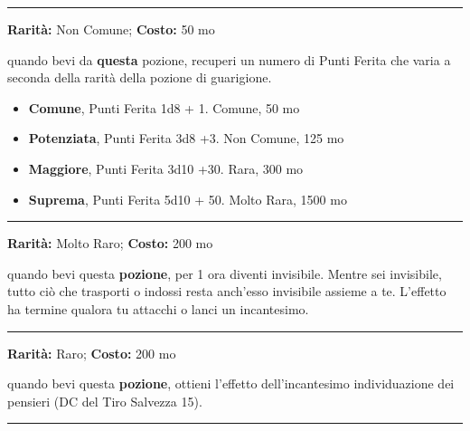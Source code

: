 \begin{multicols}{2}
\smallskip\noindent\rule{\linewidth}{2pt}  \hypertarget{PozionediGuarigione}{}\medskip{}\noindent\label{PozionediGuarigione}

\textbf{Rarità:} Non Comune; \textbf{Costo:} 50 mo

quando bevi da \textbf{questa} pozione, recuperi un numero di Punti Ferita che varia a seconda della rarità della pozione di guarigione.

\begin{itemize} \setlength\itemsep{0em}
\item \textbf{Comune}, Punti Ferita 1d8 + 1. Comune, 50 mo
\item \textbf{Potenziata}, Punti Ferita 3d8 +3. Non Comune, 125 mo
\item \textbf{Maggiore}, Punti Ferita 3d10 +30. Rara, 300 mo
\item \textbf{Suprema}, Punti Ferita 5d10 + 50. Molto Rara, 1500 mo
\end{itemize}

\smallskip\noindent\rule{\linewidth}{2pt}  \hypertarget{PozionediInvisibilità}{}\medskip{}\noindent\label{PozionediInvisibilità}

\textbf{Rarità:} Molto Raro; \textbf{Costo:} 200 mo

quando bevi questa \textbf{pozione}, per 1 ora diventi invisibile. Mentre sei invisibile, tutto ciò che trasporti o indossi resta anch'esso invisibile assieme a te. L'effetto ha termine qualora tu attacchi o lanci un incantesimo.

\smallskip\noindent\rule{\linewidth}{2pt}  \hypertarget{PozionediLetturadelPensiero}{}\medskip{}\noindent\label{PozionediLetturadelPensiero}

\textbf{Rarità:} Raro; \textbf{Costo:} 200 mo

quando bevi questa \textbf{pozione}, ottieni l'effetto dell'incantesimo individuazione dei pensieri (DC del Tiro Salvezza 15).

\smallskip\noindent\rule{\linewidth}{2pt}  \hypertarget{PozionediResistenza}{}\medskip{}\noindent\label{PozionediResistenza}


\end{multicols}
